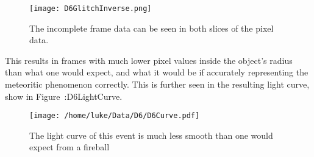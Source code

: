 \begin{figure}[ht!]
	\centering
	\texttt{[image: D6GlitchInverse.png]}
	\caption{The incomplete frame data can be seen in both slices of the pixel data.}
	\label{fig:D6Glitch}
\end{figure}

This results in frames with much lower pixel values inside the object's radius than what one would expect, and what it would be if accurately representing the meteoritic phenomenon correctly. This is further seen in the resulting light curve, show in Figure~:{D6LightCurve}.

\begin{figure}[ht!]
	\centering
	\texttt{[image: /home/luke/Data/D6/D6Curve.pdf]}
	\caption{The light curve of this event is much less smooth than one would expect from a fireball}
	\label{fig:D6LightCurve}
\end{figure}

